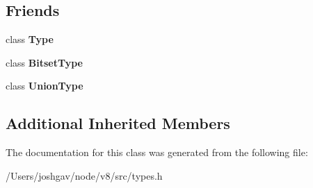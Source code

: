 \subsection*{Friends}
\begin{DoxyCompactItemize}
\item 
class {\bfseries Type}\hypertarget{classv8_1_1internal_1_1_range_type_a18dba29b4f3e91d6d2bc53472a6bb7cc}{}\label{classv8_1_1internal_1_1_range_type_a18dba29b4f3e91d6d2bc53472a6bb7cc}

\item 
class {\bfseries Bitset\+Type}\hypertarget{classv8_1_1internal_1_1_range_type_ae1bc4470107e0fde432ac5e20204635d}{}\label{classv8_1_1internal_1_1_range_type_ae1bc4470107e0fde432ac5e20204635d}

\item 
class {\bfseries Union\+Type}\hypertarget{classv8_1_1internal_1_1_range_type_a20758df53cdcc4da5691ce9545b96c4a}{}\label{classv8_1_1internal_1_1_range_type_a20758df53cdcc4da5691ce9545b96c4a}

\end{DoxyCompactItemize}
\subsection*{Additional Inherited Members}


The documentation for this class was generated from the following file\+:\begin{DoxyCompactItemize}
\item 
/\+Users/joshgav/node/v8/src/types.\+h\end{DoxyCompactItemize}
